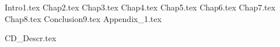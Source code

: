 \documentclass[11pt,twoside,a4paper]{book}
\begin{document}
{Intro1.tex}
{Chap2.tex}
{Chap3.tex}
{Chap4.tex}
{Chap5.tex}
{Chap6.tex}
{Chap7.tex}
{Chap8.tex}
{Conclusion9.tex}
{Appendix_1.tex}

{
\def\CS{$\cal C\kern-0.1667em\lower.5ex\hbox{$\cal S$}\kern-0.075em $}

}

{CD_Descr.tex}

\end{document}
